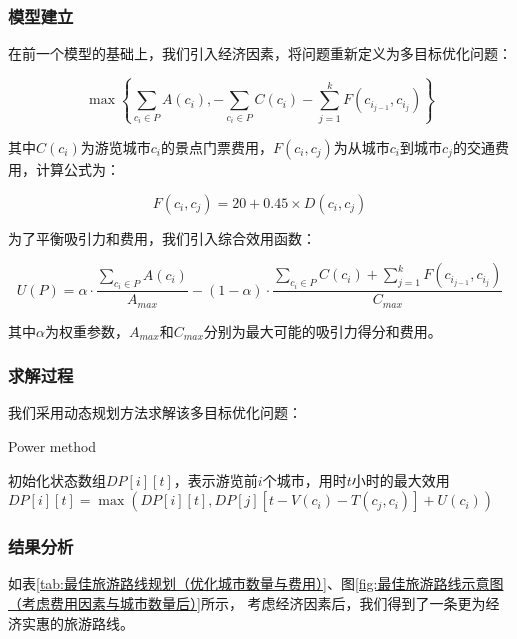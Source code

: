 \documentclass[withoutpreface,bwprint]{cumcmthesis} %
\begin{document}
\subsubsection{模型建立}
在前一个模型的基础上，我们引入经济因素，将问题重新定义为多目标优化问题：

\begin{equation}
\max \left\{ \sum_{c_i \in P} A(c_i), -\sum_{c_i \in P} C(c_i) - \sum_{j=1}^{k} F(c_{i_{j-1}}, c_{i_j}) \right\}
\end{equation}

其中$C(c_i)$为游览城市$c_i$的景点门票费用，$F(c_i, c_j)$为从城市$c_i$到城市$c_j$的交通费用，计算公式为：

\begin{equation}
F(c_i, c_j) = 20 + 0.45 \times D(c_i, c_j)
\end{equation}

为了平衡吸引力和费用，我们引入综合效用函数：

\begin{equation}
U(P) = \alpha \cdot \frac{\sum_{c_i \in P} A(c_i)}{A_{max}} - (1-\alpha) \cdot \frac{\sum_{c_i \in P} C(c_i) + \sum_{j=1}^{k} F(c_{i_{j-1}}, c_{i_j})}{C_{max}}
\end{equation}

其中$\alpha$为权重参数，$A_{max}$和$C_{max}$分别为最大可能的吸引力得分和费用。

\subsubsection{求解过程}
我们采用动态规划方法求解该多目标优化问题\cite{zhang2021}：

\begin{algorithm}[H]
    \renewcommand{\algorithmicrequire}{\textbf{Input:}}
	\renewcommand{\algorithmicensure}{\textbf{Output:}}
	\caption{Power method}
    \label{power}
    \begin{algorithmic}[1] %
\STATE 初始化状态数组$DP[i][t]$，表示游览前$i$个城市，用时$t$小时的最大效用
                \STATE $DP[i][t] = \max(DP[i][t], DP[j][t-V(c_i)-T(c_j, c_i)] + U(c_i))$
            \ENDIF
        \ENDFOR
    \ENDFOR
\ENDFOR
\end{algorithmic}
\end{algorithm}

\subsubsection{结果分析}
如表\ref{tab:最佳旅游路线规划（优化城市数量与费用）}、图\ref{fig:最佳旅游路线示意图（考虑费用因素与城市数量后）}所示，
考虑经济因素后，我们得到了一条更为经济实惠的旅游路线。
\end{document}
